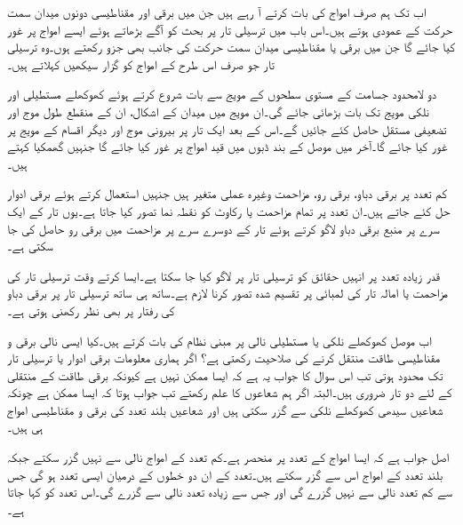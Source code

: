 اب تک ہم صرف    امواج کی بات کرتے آ رہے ہیں جن میں برقی اور مقناطیسی دونوں میدان سمت حرکت کے عمودی ہوتے ہیں۔اس باب میں ترسیلی تار پر بحث کو آگے بڑھاتے ہوئے ایسے امواج پر غور کیا جائے گا جن میں برقی یا مقناطیسی میدان سمت حرکت کی جانب بھی جزو رکھتے ہوں۔وہ ترسیلی تار جو صرف اس طرح کے امواج کو گزار سیکھیں  کہلاتے ہیں۔

دو لامحدود جسامت کے مستوی سطحوں کے مویج سے بات شروع کرتے ہوئے کھوکھلے مستطیلی اور نلکی مویج تک بات بڑھائی جائے گی۔ان مویج میں میدان کے اشکال، ان کے منقطع طول موج اور تضعیفی مستقل  حاصل کئے جائیں گے۔اس کے بعد ایک تار پر بیرونی موج اور دیگر اقسام کے مویج پر غور کیا جائے گا۔آخر میں موصل کے بند ڈبوں میں قید امواج پر غور کیا جائے گا جنہیں گھمکیا کہتے ہیں۔

کم تعدد پر برقی دباو، برقی رو، مزاحمت وغیرہ عملی متغیر ہیں جنہیں استعمال کرتے ہوئے برقی ادوار حل کئے جاتے ہیں۔ان تعدد پر تمام مزاحمت یا رکاوٹ کو نقطہ نما تصور کیا جاتا ہے۔یوں تار کے ایک سرے پر منبع برقی دباو لاگو کرتے ہوئے تار کے دوسرے سرے پر مزاحمت میں برقی رو حاصل کی جا سکتی ہے۔

قدر زیادہ تعدد پر انہیں حقائق کو ترسیلی تار پر لاگو کیا جا سکتا ہے۔ایسا کرتے وقت ترسیلی تار کی مزاحمت یا امالہ تار کی لمبائی پر تقسیم شدہ  تصور کرنا لازم ہے۔ساتھ ہی ساتھ ترسیلی تار پر برقی دباو کی رفتار پر بھی نظر رکھنی ہوتی ہے۔

اب موصل کھوکھلے نلکی یا مستطیلی نالی پر مبنی نظام کی بات کرتے ہیں۔کیا ایسی نالی برقی و مقناطیسی طاقت منتقل کرنے کی صلاحیت رکھتی ہے؟ اگر ہماری معلومات برقی ادوار یا ترسیلی تار تک محدود ہوتی تب اس سوال کا جواب یہ ہے کہ ایسا ممکن نہیں ہے کیونکہ برقی طاقت کے منتقلی کے لئے دو تار ضروری ہیں۔البتہ اگر ہم شعاعوں کا علم رکھتے تب جواب ہوتا کہ ایسا ممکن ہے چونکہ شعاعیں سیدھی کھوکھلے نلکی سے گزر سکتی ہیں اور شعاعیں بلند تعدد  کی برقی و مقناطیسی امواج ہی ہیں۔

اصل جواب ہے کہ ایسا امواج کے تعدد پر منحصر ہے۔کم تعدد کے امواج نالی سے نہیں گزر سکتے جبکہ بلند تعدد کے امواج اس سے گزر سکتے ہیں۔تعدد کے ان دو خطوں کے درمیان ایسی تعدد ہو گی جس سے کم تعدد نالی سے نہیں گزرے گی اور جس سے زیادہ تعدد نالی سے گزرے گی۔اس تعدد کو  کہا جاتا ہے۔ 

